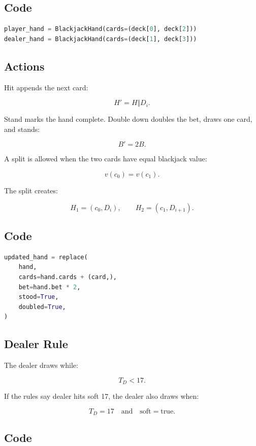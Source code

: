 \documentclass[11pt]{article}
\begin{document}
\subsection{Code}

\begin{lstlisting}[language=Python]
player_hand = BlackjackHand(cards=(deck[0], deck[2]))
dealer_hand = BlackjackHand(cards=(deck[1], deck[3]))
\end{lstlisting}

\subsection{Actions}

Hit appends the next card:

\[
H'=H\Vert D_i.
\]

Stand marks the hand complete. Double down doubles the bet, draws one card, and stands:

\[
B'=2B.
\]

A split is allowed when the two cards have equal blackjack value:

\[
v(c_0)=v(c_1).
\]

The split creates:

\[
H_1=(c_0,D_i),\qquad H_2=(c_1,D_{i+1}).
\]

\subsection{Code}

\begin{lstlisting}[language=Python]
updated_hand = replace(
    hand,
    cards=hand.cards + (card,),
    bet=hand.bet * 2,
    stood=True,
    doubled=True,
)
\end{lstlisting}

\subsection{Dealer Rule}

The dealer draws while:

\[
T_D<17.
\]

If the rules say dealer hits soft 17, the dealer also draws when:

\[
T_D=17\quad\text{and}\quad\text{soft}=\text{true}.
\]

\subsection{Code}
\end{document}

